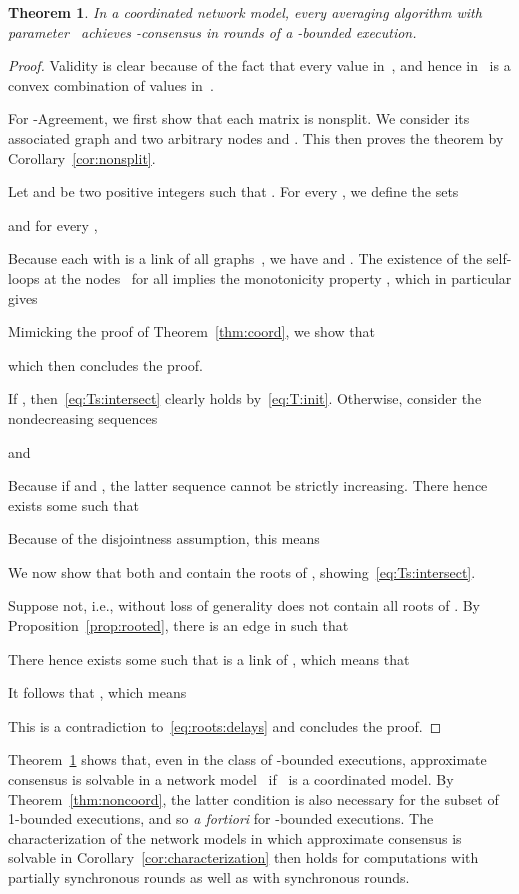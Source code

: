 \documentclass[a4paper]{article}
\theoremstyle{newthm}
\newtheorem{thm}{Theorem}
\begin{document}
\begin{thm}\label{thm:coord:delay}
In a coordinated network model, every averaging algorithm with parameter~ achieves -consensus
in  rounds of a -bounded execution.
\end{thm}
\begin{proof}
Validity is clear because of the fact that every value in~, and
	hence in~ is a convex combination of values in~.

For -Agreement,  we first show that each matrix  
	is nonsplit.
We consider its associated graph  
	and two arbitrary nodes   and .
This then proves the theorem by Corollary~\ref{cor:nonsplit}.

\medskip

Let  and  be two positive integers such that .
For every , we define the sets

and for every ,

Because each  with  
	is a link of  all graphs~, we have 
and
.
The existence of the self-loops at the nodes~ for all 
implies the monotonicity property , which in
particular gives

Mimicking the proof of Theorem~\ref{thm:coord}, we show that 

which then concludes the proof.

If , then~\eqref{eq:Ts:intersect} clearly holds by~\eqref{eq:T:init}.
Otherwise, consider the nondecreasing sequences
	 
	
and 


Because  if  and
, the latter sequence cannot be strictly
increasing.
There hence exists some  such that

Because of the disjointness assumption, this means 

We now show that both 
 and  contain the roots of ,
showing~\eqref{eq:Ts:intersect}.

Suppose not, i.e., without loss of generality  does not contain all roots of .
By Proposition~\ref{prop:rooted}, there is an edge  in
 such that

There hence exists some  such that
 is a link  of , which
means that

It follows that , which means

This is a contradiction to~\eqref{eq:roots:delays} and concludes the proof.
\end{proof}


Theorem~\ref{thm:coord:delay} shows that, even in the class of -bounded
	executions, approximate consensus is solvable in a network model~
	if~ is a coordinated model.
By Theorem~\ref{thm:noncoord}, the latter condition is also necessary for the subset of 
	1-bounded executions, and so {\it a fortiori} for -bounded executions.
The characterization of the network models in which approximate consensus is solvable 
	in Corollary~\ref{cor:characterization} then holds for computations with
	partially synchronous rounds as well as with  synchronous rounds.  
\end{document}
